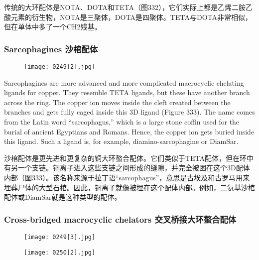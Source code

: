 \documentclass[dvipsnames, svgnames,a4paper,11pt]{article}
\begin{document}
传统的大环配体是NOTA、DOTA和TETA（图332），它们实际上都是乙烯二胺乙酸元素的衍生物，NOTA是三聚体，DOTA是四聚体。TETA与DOTA非常相似，但在单体中多了一个CH2残基。



\subsubsection{Sarcophagines 沙棺配体}  

\begin{figure}[h]
	\centering
    \texttt{[image: 0249[2].jpg]}  
     \label{fig333}
\end{figure}


Sarcophagines are more advanced and more complicated macrocyclic chelating ligands for copper. They resemble TETA ligands, but these have another branch across the ring. The copper ion moves inside the cleft created between the branches and gets fully caged inside this 3D ligand (Figure 333). The name comes from the Latin word “sarcophagus,” which is a large stone coffin used for the burial of ancient Egyptians and Romans. Hence, the copper ion gets buried inside this ligand. Such a ligand is, for example, diamino-sarcophagine or DiamSar.

沙棺配体是更先进和更复杂的铜大环螯合配体。它们类似于TETA配体，但在环中有另一个支链。铜离子进入这些支链之间形成的缝隙，并完全被困在这个3D配体内部（图333）。该名称来源于拉丁语“sarcophagus”，意思是古埃及和古罗马用来埋葬尸体的大型石棺。因此，铜离子就像被埋在这个配体内部。例如，二氨基沙棺配体或DiamSar就是这种类型的配体。

\subsubsection{Cross-bridged macrocyclic chelators 交叉桥接大环螯合配体}  

\begin{figure}[h]
	\centering
    \texttt{[image: 0249[3].jpg]}  
     \label{fig334}
\end{figure}

\begin{figure}[h]
	\centering
    \texttt{[image: 0250[2].jpg]}  
     \label{fig335}
\end{figure}
\end{document}
